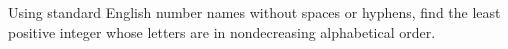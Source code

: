 Using standard English number names without spaces or hyphens, find the least positive integer whose letters are in nondecreasing alphabetical order.
